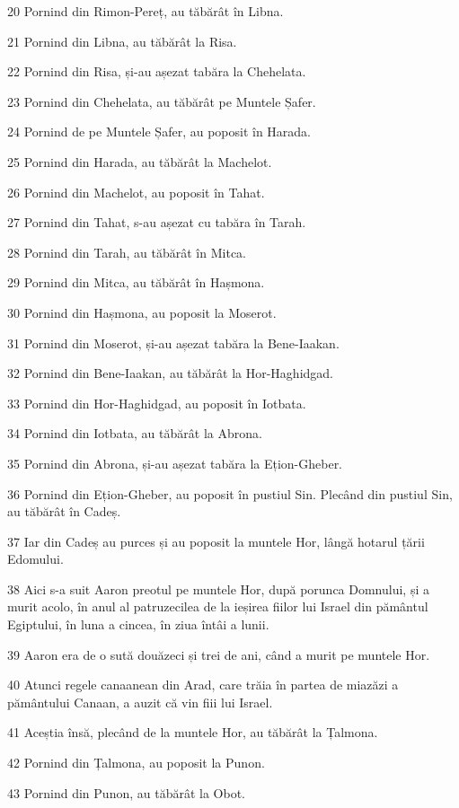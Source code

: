 \par 20 Pornind din Rimon-Pereț, au tăbărât în Libna.
\par 21 Pornind din Libna, au tăbărât la Risa.
\par 22 Pornind din Risa, și-au așezat tabăra la Chehelata.
\par 23 Pornind din Chehelata, au tăbărât pe Muntele Șafer.
\par 24 Pornind de pe Muntele Șafer, au poposit în Harada.
\par 25 Pornind din Harada, au tăbărât la Machelot.
\par 26 Pornind din Machelot, au poposit în Tahat.
\par 27 Pornind din Tahat, s-au așezat cu tabăra în Tarah.
\par 28 Pornind din Tarah, au tăbărât în Mitca.
\par 29 Pornind din Mitca, au tăbărât în Hașmona.
\par 30 Pornind din Hașmona, au poposit la Moserot.
\par 31 Pornind din Moserot, și-au așezat tabăra la Bene-Iaakan.
\par 32 Pornind din Bene-Iaakan, au tăbărât la Hor-Haghidgad.
\par 33 Pornind din Hor-Haghidgad, au poposit în Iotbata.
\par 34 Pornind din Iotbata, au tăbărât la Abrona.
\par 35 Pornind din Abrona, și-au așezat tabăra la Ețion-Gheber.
\par 36 Pornind din Ețion-Gheber, au poposit în pustiul Sin. Plecând din pustiul Sin, au tăbărât în Cadeș.
\par 37 Iar din Cadeș au purces și au poposit la muntele Hor, lângă hotarul țării Edomului.
\par 38 Aici s-a suit Aaron preotul pe muntele Hor, după porunca Domnului, și a murit acolo, în anul al patruzecilea de la ieșirea fiilor lui Israel din pământul Egiptului, în luna a cincea, în ziua întâi a lunii.
\par 39 Aaron era de o sută douăzeci și trei de ani, când a murit pe muntele Hor.
\par 40 Atunci regele canaanean din Arad, care trăia în partea de miazăzi a pământului Canaan, a auzit că vin fiii lui Israel.
\par 41 Aceștia însă, plecând de la muntele Hor, au tăbărât la Țalmona.
\par 42 Pornind din Țalmona, au poposit la Punon.
\par 43 Pornind din Punon, au tăbărât la Obot.
